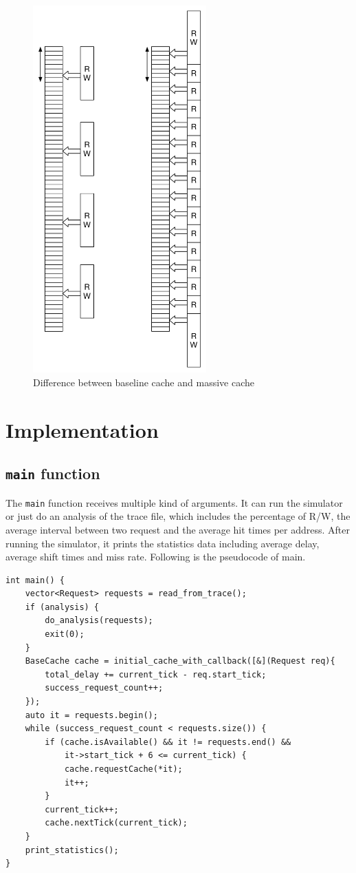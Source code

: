 \documentclass[11pt]{article}
\begin{document}
\begin{figure}
\centering
\includegraphics[height=400pt]{fig3.pdf}
\caption{Difference between baseline cache and massive cache}
\label{fig:massive}
\end{figure}

\section{Implementation}

\subsection{\texttt{main} function}

The \texttt{main} function receives multiple kind of arguments. It can run the simulator or just do an analysis of the trace file, which includes the percentage of R/W, the average interval between two request and the average hit times per address. After running the simulator, it prints the statistics data including average delay, average shift times and miss rate. Following is the pseudocode of main.

\begin{verbatim}
int main() {
    vector<Request> requests = read_from_trace();
    if (analysis) {
        do_analysis(requests);
        exit(0);
    }
    BaseCache cache = initial_cache_with_callback([&](Request req){
        total_delay += current_tick - req.start_tick;
        success_request_count++;
    });
    auto it = requests.begin();
    while (success_request_count < requests.size()) {
        if (cache.isAvailable() && it != requests.end() &&
            it->start_tick + 6 <= current_tick) {
            cache.requestCache(*it);
            it++;
        }
        current_tick++;
        cache.nextTick(current_tick);
    }
    print_statistics();
}
\end{verbatim}
\end{document}
